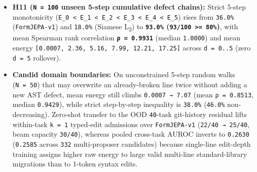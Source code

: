 \documentclass[10pt,letterpaper]{article}
\begin{document}
\begin{itemize}
  (\texttt{50/200} Siamese L\textsubscript{2}) to
  \textbf{\texttt{84.05\%} on the \texttt{163} solvable beams
  (\texttt{137/163}; \texttt{68.50\%} raw across all \texttt{200}
  beams)} and cutting mean \texttt{rce\ check} invocations to first
  valid Form by \textbf{\texttt{2.39×}} (\texttt{3.577} to
  \texttt{1.497} checks/beam). Ten-thread CPU scoring costs
  \textbf{\texttt{47.09\ mJ}} core RAPL per candidate
  (\texttt{6.30\ ms}; \texttt{752.\allowbreak{}03\ mJ} core and \texttt{11.88\ J}
  gross package per 16-item beam, with
  \texttt{derived\_\allowbreak{}marginal\_\allowbreak{}pkg\_\allowbreak{}reported\_\allowbreak{}j\ =\ None} under Falsifier
  6 at \texttt{13.7\%} idle drift).
\item
  \textbf{H11 (\texttt{N\ =\ 100} unseen 5-step cumulative defect
  chains):} Strict 5-step monotonicity
  (\texttt{E\_0\ \textless{}\ E\_1\ \textless{}\ E\_2\ \textless{}\ E\_3\ \textless{}\ E\_4\ \textless{}\ E\_5})
  rises from \texttt{36.0\%} (\texttt{FormJEPA-\allowbreak{}v1}) and \texttt{18.0\%}
  (Siamese L\textsubscript{2}) to \textbf{\texttt{93.0\%}
  (\texttt{93/100\ \textgreater{}=\ 80\%})}, with mean Spearman rank
  correlation \textbf{\texttt{ρ\ =\ 0.\allowbreak{}9931}} (median \texttt{1.0000})
  and mean energy
  \texttt{{[}0.0007,\ 2.36,\ 5.16,\ 7.99,\ 12.21,\ 17.25{]}} across
  \texttt{d\ =\ 0.\allowbreak{}.\allowbreak{}5} (zero \texttt{d\ =\ 5} rollover).
\item
  \textbf{Candid domain boundaries:} On unconstrained 5-step random
  walks (\texttt{N\ =\ 50}) that may overwrite an already-broken line
  twice without adding a new AST defect, mean energy still climbs
  \texttt{0.\allowbreak{}0007\ →\ 7.\allowbreak{}07} (mean \texttt{ρ\ =\ 0.\allowbreak{}8513}, median
  \texttt{0.9429}), while strict step-by-step inequality is
  \texttt{38.0\%} (\texttt{46.0\%} non-decreasing). Zero-shot transfer
  to the OOD \texttt{40}-task git-history residual lifts within-task
  \texttt{k\ =\ 1} typed-edit admissions over \texttt{FormJEPA-\allowbreak{}v1}
  (\texttt{22/\allowbreak{}40\ →\ 25/\allowbreak{}40}, beam capacity \texttt{30/40}), whereas
  pooled cross-task AUROC inverts to \texttt{0.2630} (\texttt{0.2585}
  across \texttt{332} multi-proposer candidates) because single-line
  edit-depth training assigns higher raw energy to large valid
  multi-line standard-library migrations than to 1-token syntax edits.


\end{itemize}
\end{document}
